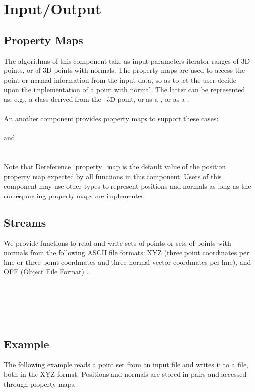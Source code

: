 \section{Input/Output}


\subsection{Property Maps}

The algorithms of this component take as input parameters iterator ranges of 3D points, or of 3D points with normals. The property maps are used to access the point or normal information from the input data, so as to let the user decide upon the implementation of a point with normal. The latter can be represented as, e.g., a class derived from the \cgal\ 3D point, or as a
, or as a .\\
\\

An another component provides property maps to support these cases:  \\
  \\
 and   \\
  \\
\\
Note that Dereference_property_map is the default value of the position property map expected by all functions in this component. Users of this component may use other types to represent positions and normals as long as the corresponding property maps are implemented.


\subsection{Streams}

We provide functions to read and write sets of points or sets of points with normals from the following ASCII file formats: XYZ (three point coordinates  per line or three point coordinates and three normal vector coordinates  per line), and OFF (Object File Format) \cite{cgal:p-gmgv16-96}.

  \\
  \\
 \\
 \\


\subsection{Example}

The following example reads a point set from an input file and writes it to a file, both in the XYZ format. Positions and normals are stored in pairs and accessed through property maps.
